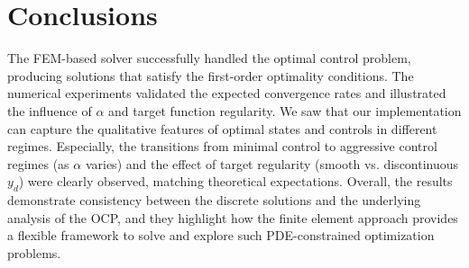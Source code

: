 \documentclass{article}
\begin{document}
\section{Conclusions}
The FEM-based solver successfully handled the optimal control problem, producing solutions that satisfy the first-order optimality conditions. The numerical experiments validated the expected convergence rates and illustrated the influence of $\alpha$ and target function regularity. We saw that our implementation can capture the qualitative features of optimal states and controls in different regimes. Especially, the transitions from minimal control to aggressive control regimes (as $\alpha$ varies) and the effect of target regularity (smooth vs. discontinuous $y_d$) were clearly observed, matching theoretical expectations. Overall, the results demonstrate consistency between the discrete solutions and the underlying analysis of the OCP, and they highlight how the finite element approach provides a flexible framework to solve and explore such PDE-constrained optimization problems.
\end{document}

